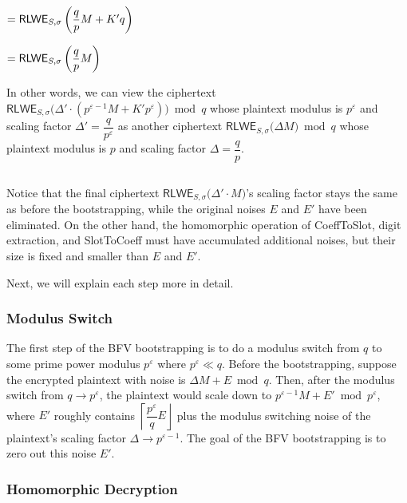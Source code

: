 \begin{enumerate}
$ = \textsf{RLWE}_{S, \sigma}\bm\left(\dfrac{q}{p}M + K'q \bm\right)$

$ = \textsf{RLWE}_{S, \sigma}\bm\left(\dfrac{q}{p}M \bm\right)$


In other words, we can view the ciphertext $ \textsf{RLWE}_{S, \sigma}\bm(\Delta' \cdot (p^{\varepsilon-1} M + K'p^\varepsilon )\bm) \bmod q$ whose plaintext modulus is $p^\varepsilon$ and scaling factor $\Delta' = \dfrac{q}{p^\varepsilon}$ as another ciphertext $ \textsf{RLWE}_{S, \sigma}\bm(\Delta M \bm) \bmod q$ whose plaintext modulus is $p$ and scaling factor $\Delta = \dfrac{q}{p}$. 




\end{enumerate}

$ $

Notice that the final ciphertext $ \textsf{RLWE}_{S, \sigma}\bm(\Delta' \cdot M \bm)$'s scaling factor stays the same as before the bootstrapping, while the original noises $E$ and $E'$ have been eliminated. On the other hand, the homomorphic operation of \textsf{CoeffToSlot}, digit extraction, and \textsf{SlotToCoeff} must have accumulated additional noises, but their size is fixed and smaller than $E$ and $E'$. 

Next, we will explain each step more in detail. 

\subsubsection{Modulus Switch}
\label{subsubsec:bfv-bootstrapping-modulus-switch}

The first step of the BFV bootstrapping is to do a modulus switch from $q$ to some prime power modulus $p^\varepsilon$ where $p^\varepsilon \ll q$. Before the bootstrapping, suppose the encrypted plaintext with noise is $\Delta M + E \bmod q$. Then, after the modulus switch from $q \rightarrow p^\varepsilon$, the plaintext would scale down to $p^{\varepsilon-1}M + E' \bmod p^\varepsilon$, where $E'$ roughly contains $\left\lceil\dfrac{p^\varepsilon}{q} E\right\rfloor$ plus the modulus switching noise of the plaintext's scaling factor $\Delta \rightarrow p^{\varepsilon-1}$. The goal of the BFV bootstrapping is to zero out this noise $E'$.  

\subsubsection{Homomorphic Decryption}
\label{subsubsec:bfv-bootstrapping-homomorphic-decryption}

